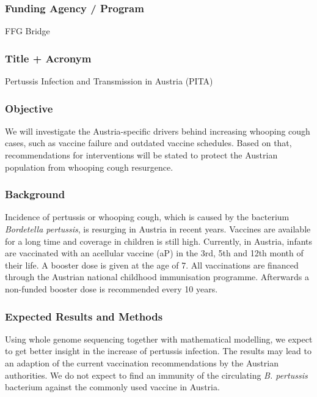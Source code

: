 \documentclass[10pt,a4paper]{article}\usepackage[]{graphicx}\usepackage[]{color}
\author{Lukas Richter}
\begin{document}
\pagestyle{fancy}

\subsubsection*{Funding Agency / Program}
FFG Bridge

\subsubsection*{Title + Acronym}
Pertussis Infection and Transmission in Austria (PITA)

\subsubsection*{Objective}
We will investigate the Austria-specific drivers behind increasing whooping cough cases, such as vaccine failure and outdated vaccine schedules. Based on that, recommendations for interventions will be stated to protect the Austrian population from whooping cough resurgence.

\subsubsection*{Background}
Incidence of pertussis or whooping cough, which is caused by the bacterium \textit{Bordetella pertussis}, is resurging in Austria in recent years. Vaccines are available for a long time and coverage in children is still high. Currently, in Austria, infants are vaccinated with an acellular vaccine (aP) in the 3rd, 5th and 12th month of their life. A booster dose is given at the age of 7. All vaccinations are financed through the Austrian national childhood immunisation programme. Afterwards a non-funded booster dose is recommended every 10 years. %

\subsubsection*{Expected Results and Methods}
Using whole genome sequencing together with mathematical modelling, we expect to get better insight in the increase of pertussis infection. The results may lead to an adaption of the current vaccination recommendations by the Austrian authorities. We do not expect to find an immunity of the circulating \textit{B. pertussis} bacterium against the commonly used vaccine in Austria.
\end{document}
